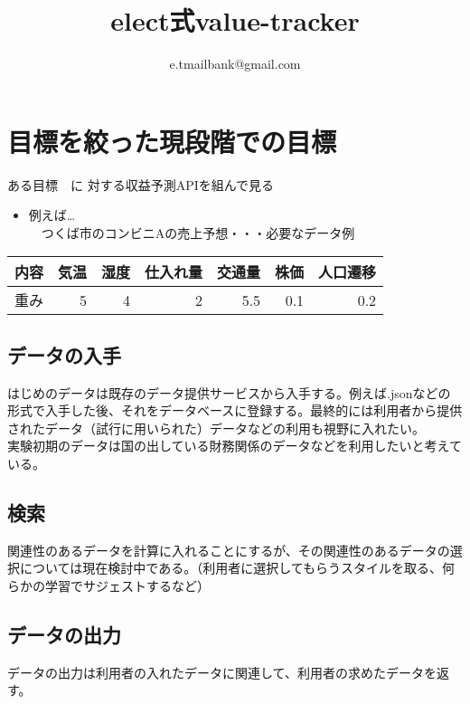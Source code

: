 \documentclass{scrartcl}
\author{e.tmailbank@gmail.com}
\date{}
\title{elect式value-tracker}
\begin{document}
\maketitle
\section{目標を絞った現段階での目標}
\label{sec:org7554ffa}
ある目標　に 対する収益予測APIを組んで見る\\
\begin{itemize}
\item 例えば\ldots{}\\
　つくば市のコンビニAの売上予想・・・必要なデータ例\\
\end{itemize}
\begin{center}
\begin{tabular}{lrrrrrr}
\hline
内容 & 気温 & 湿度 & 仕入れ量 & 交通量 & 株価 & 人口遷移\\
\hline
重み & 5 & 4 & 2 & 5.5 & 0.1 & 0.2\\
\hline
\end{tabular}
\end{center}
\subsection{データの入手}
\label{sec:org2df6d65}
はじめのデータは既存のデータ提供サービスから入手する。例えば.jsonなどの形式で入手した後、それをデータベースに登録する。最終的には利用者から提供されたデータ（試行に用いられた）データなどの利用も視野に入れたい。\\
実験初期のデータは国の出している財務関係のデータなどを利用したいと考えている。\\
\subsection{検索}
\label{sec:orgbfd6377}
関連性のあるデータを計算に入れることにするが、その関連性のあるデータの選択については現在検討中である。（利用者に選択してもらうスタイルを取る、何らかの学習でサジェストするなど）\\
\subsection{データの出力}
\label{sec:orga2fe1b5}
データの出力は利用者の入れたデータに関連して、利用者の求めたデータを返す。\\
\end{document}
